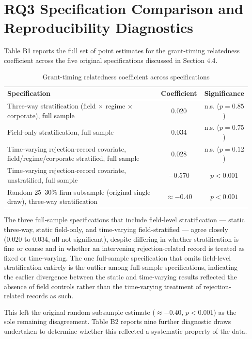 \documentclass[12pt]{article}
\begin{document}
\section{RQ3 Specification Comparison and Reproducibility Diagnostics}

Table B1 reports the full set of point estimates for the grant-timing relatedness coefficient across the five original specifications discussed in Section 4.4.

\begin{table}[htbp]
\centering
\small
\caption{Grant-timing relatedness coefficient across specifications}
\label{tab:appendixB1}
\begin{tabular}{p{9.5cm}cc}
\toprule
Specification & Coefficient & Significance \\
\midrule
Three-way stratification (field $\times$ regime $\times$ corporate), full sample & 0.020 & n.s. ($p=0.85$) \\
Field-only stratification, full sample & 0.034 & n.s. ($p=0.75$) \\
Time-varying rejection-record covariate, field/regime/corporate stratified, full sample & 0.028 & n.s. ($p=0.12$) \\
Time-varying rejection-record covariate, unstratified, full sample & $-0.570$ & $p<0.001$ \\
Random 25--30\% firm subsample (original single draw), three-way stratification & $\approx-0.40$ & $p<0.001$ \\
\bottomrule
\end{tabular}
\end{table}

The three full-sample specifications that include field-level stratification --- static three-way, static field-only, and time-varying field-stratified --- agree closely (0.020 to 0.034, all not significant), despite differing in whether stratification is fine or coarse and in whether an intervening rejection-related record is treated as fixed or time-varying. The one full-sample specification that omits field-level stratification entirely is the outlier among full-sample specifications, indicating the earlier divergence between the static and time-varying results reflected the absence of field controls rather than the time-varying treatment of rejection-related records as such.

This left the original random subsample estimate ($\approx-0.40$, $p<0.001$) as the sole remaining disagreement. Table B2 reports nine further diagnostic draws undertaken to determine whether this reflected a systematic property of the data.
\end{document}
